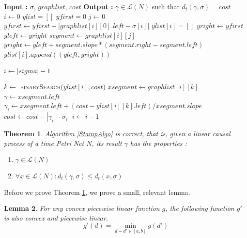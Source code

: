 \documentclass{article}
\newtheorem{theorem}{Theorem}
\newtheorem{lemma}[theorem]{Lemma}
\theoremstyle{Definition}
\theoremstyle{definition}
\begin{document}
\begin{algorithm}
	\caption{Backtracking through graphs with the cost to find the best word}
	\label{AuxFunc3}
	\begin{algorithmic}
		\State \textbf{Input : }  $\sigma$, $graphlist$, $cost$
		\State \textbf{Output : }  $\gamma \in \mathcal{L}(N)$ such that $d_t(\gamma, \sigma) = cost$\\
		
		\State $i \gets 0$
		\State $ylist = []$
		\State $yfirst = 0$
		\State $j \gets 0$
		\State $yfirst \gets yfirst + |graphlist[i][0].left - \sigma[i]|$
		\State $ylist[i] = []$
		\State $yright \gets yfirst$
		\State $yleft \gets yright$
		\State $segment \gets graphlist[i][j]$
		\State $yright \gets yleft + segment.slope * (segment.right - segment.left)$
		\State $ylist[i].append((yleft, yright))$
		\EndFor
		\EndFor
		
		\State $i \gets |sigma|-1$
		
		\State $k \gets $ \textsc{binarySearch}($ylist[i], cost$)
		\State $xsegment \gets graphlist[i][k]$
		\State $\gamma \gets xsegment.left$
		\Else
		\State $\gamma_i \gets xsegment.left + (cost - ylist[i][k].left)/ xsegment.slope$
		\EndIf
		\State $cost \gets cost - |\gamma_i - \sigma_i|$
		\State $i \gets i-1$
		\EndWhile
		
	\end{algorithmic}
\end{algorithm}

	\begin{theorem}\label{StampAlgoCorr} Algorithm \ref{StampAlgo} is correct, that is, given a linear causal process of a time Petri Net $N$, its result $\gamma$ has the properties : 
	\begin{enumerate}
		\item $\gamma \in \mathcal{L}(N)$
		\item $\forall x \in \mathcal{L}(N)  : d_t(\gamma, \sigma)  \leq  {d_t(x, \sigma)}$
	\end{enumerate}
\end{theorem}

Before we prove Theorem \ref{StampAlgoCorr}, we prove a small, relevant lemma. 

\begin{lemma}\label{minpwc}
	For any convex piecewise linear function $g$, the following function $g'$ is also convex and piecewise linear. 
	$$g'(d) = \min_{d-d' \in [a,b]} g(d')$$
	
\end{lemma}
\end{document}
